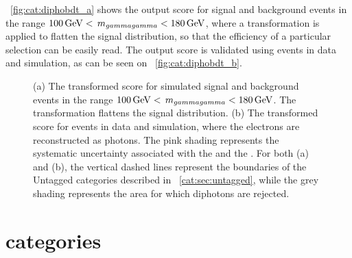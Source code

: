 \Fig~\ref{fig:cat:diphobdt_a} shows the \DiPhoBdt output score for signal and background events in the range $100\,\text{Ge\hspace{-.08em}V} < \,m_{gammagamma} < 180\,\text{Ge\hspace{-.08em}V}$, where a transformation is applied to flatten the signal distribution, so that the efficiency of a particular selection can be easily read. The \DiPhoBdt output score is validated using \Zee events in data and simulation, as can be seen on \Fig~\ref{fig:cat:diphobdt_b}.
\begin{figure}[h]
\centering
\caption{ (a) The transformed \DiPhoBdt score for simulated signal and background events in the range $100\,\text{Ge\hspace{-.08em}V} < \,m_{gammagamma} < 180\,\text{Ge\hspace{-.08em}V}$. The transformation flattens the signal distribution. (b) The transformed \DiPhoBdt score for \Zee events in data and simulation, where the electrons are reconstructed as photons. The pink shading represents the systematic uncertainty associated with the \PhoIdBdt and the \PhoEnergyBdt. For both (a) and (b), the vertical dashed lines represent the boundaries of the Untagged categories described in \Sec~\ref{cat:sec:untagged}, while the grey shading represents the area for which diphotons are rejected.}
\label{fig:cat:diphobdt}
\end{figure}

\section{\VBFTag categories }
\label{cat:sec:vbftag}

